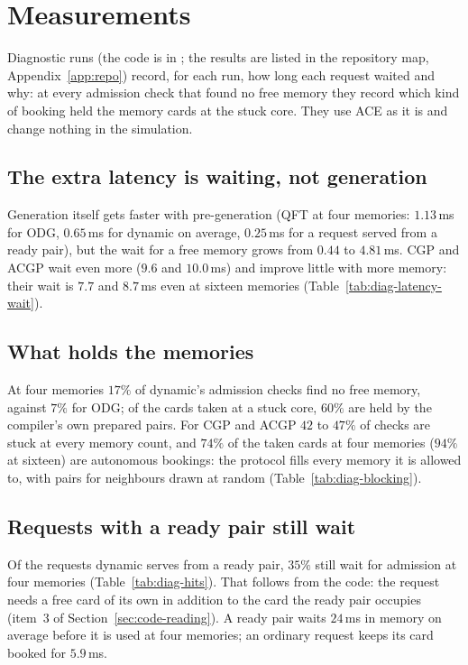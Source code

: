 \section{Measurements}
\label{sec:measurements}
Diagnostic runs (the code is in ; the results are listed in the repository map, Appendix~\ref{app:repo}) record, for each run, how long each request waited and why: at every
admission check that found no free memory they record which kind of booking held the memory cards at the stuck core. They use ACE as it is and change nothing in the simulation.

\subsection{The extra latency is waiting, not generation}

Generation itself gets faster with pre-generation (QFT at four memories: $1.13$\,ms for ODG, $0.65$\,ms for dynamic on average, $0.25$\,ms for a request served from a ready pair),
but the wait for a free memory grows from $0.44$ to $4.81$\,ms. CGP and ACGP wait even more ($9.6$ and $10.0$\,ms) and improve little with more memory: their wait is
$7.7$ and $8.7$\,ms even at sixteen memories (Table~\ref{tab:diag-latency-wait}).

\subsection{What holds the memories}

At four memories $17\%$ of dynamic's admission checks find no free memory, against $7\%$ for ODG; of the cards taken at a stuck core, $60\%$ are held by the compiler's own prepared
pairs. For CGP and ACGP $42$ to $47\%$ of checks are stuck at every memory count, and $74\%$ of the taken cards at four memories ($94\%$ at sixteen) are autonomous bookings: the
protocol fills every memory it is allowed to, with pairs for neighbours drawn at random (Table~\ref{tab:diag-blocking}).

\subsection{Requests with a ready pair still wait}

Of the requests dynamic serves from a ready pair, $35\%$ still wait for admission at four memories (Table~\ref{tab:diag-hits}). That follows from the code: the request needs a free card of its own
in addition to the card the ready pair occupies (item~3 of Section~\ref{sec:code-reading}).
A ready pair waits $24$\,ms in memory on average before it is used at four memories; an ordinary request keeps its card booked for $5.9$\,ms.

